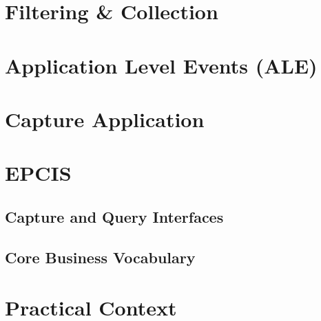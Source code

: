 \section{Filtering \& Collection}

\section{Application Level Events (ALE)}

\section{Capture Application}

\section{EPCIS}


\subsection{Capture and Query Interfaces}

\subsection{Core Business Vocabulary}

\section{Practical Context}


\cleardoublepage